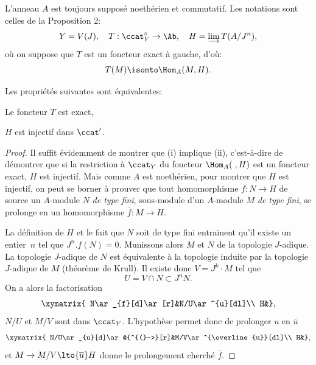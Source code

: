 L'anneau $A$ est toujours suppos\'e noeth\'erien et commutatif. Les notations sont celles de la Proposition 2:
\begin{equation*} Y=V(J), \quad T:\ccat_{Y}^{\circ}\to \Ab, \quad H=\varinjlim T(A/J^{n}),
\end{equation*}
o\`u on suppose que $T$ est un foncteur exact \`a gauche, d'o\`u:
\begin{equation*} T(M)\isomto \Hom_{A}(M, H).
\end{equation*}

\begin{proposition} \label{IV.2.1}
Les propri\'et\'es suivantes sont \'equivalentes:
\begin{enumeratei}
\item
Le foncteur $T$ est exact,

\item
$H$ est injectif dans $\ccat'$.
\end{enumeratei}
\end{proposition}

\begin{proof}
Il suffit \'evidemment de montrer que (i) implique (ii), c'est-\`a-dire de d\'emontrer que si la restriction \`a $\ccat_{Y}$ du foncteur $\Hom_{A}(\;, H)$ est un foncteur exact, $H$ est injectif. Mais comme $A$ est noeth\'erien, pour montrer que $H$ est injectif, on peut se borner \`a prouver que tout homomorphisme $f:N\to H$ de source un $A$-module $N$ \emph{de type fini}, sous-module d'un $A$-module $M$ \emph{de type fini}, se prolonge en un homomorphisme $\overline{f}:M\to H$.

La d\'efinition de $H$ et le fait que $N$ soit de type fini entrainent qu'il existe un entier~$n$ tel que $J^{n}.f(N)=0$. Munissons alors $M$ et $N$ de la topologie $J$-adique. La topologie $J$-adique de $N$ est \'equivalente \`a la topologie induite par la topologie $J$-adique de $M$ (th\'eor\`eme de Krull). Il existe donc $V=J^{k}\cdot M$ tel que
\begin{equation*} U=V\cap N\subset J^{n}N.
\end{equation*}
On a alors la factorisation
$$
\xymatrix{ N\ar_{f}[d]\ar[r]&N/U\ar^{u}[dl]\\
H&},
$$
$N/U$ et $M/V$ sont dans $\ccat_{Y}$. L'hypoth\`ese permet donc de prolonger $u$ en $\overline{u}$
$$
\xymatrix{ N/U\ar_{u}[d]\ar@{^{(}->}[r]&M/V\ar^{\overline{u}}[dl]\\
H&},
$$
et $M\to M/V\lto{\overline{u}} H$ donne le prolongement cherch\'e $\overline{f}$.
\skipqed
\end{proof}

